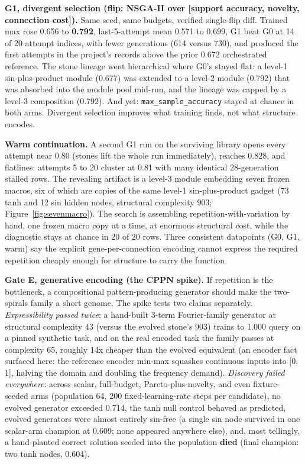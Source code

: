 \documentclass[11pt]{article}
\begin{document}
\textbf{G1, divergent selection (flip: NSGA-II over [support accuracy, novelty, connection cost]).} Same seed, same budgets, verified single-flip diff. Trained max rose 0.656 to \textbf{0.792}, last-5-attempt mean 0.571 to 0.699, G1 beat G0 at 14 of 20 attempt indices, with fewer generations (614 versus 730), and produced the first attempts in the project's records above the prior 0.672 orchestrated reference. The stone lineage went hierarchical where G0's stayed flat: a level-1 sin-plus-product module (0.677) was extended to a level-2 module (0.792) that was absorbed into the module pool mid-run, and the lineage was capped by a level-3 composition (0.792). And yet: \texttt{max_sample_accuracy} stayed at chance in both arms. Divergent selection improves what training finds, not what structure encodes.

\textbf{Warm continuation.} A second G1 run on the surviving library opens every attempt near 0.80 (stones lift the whole run immediately), reaches 0.828, and flatlines: attempts 5 to 20 cluster at 0.81 with many identical 28-generation stalled rows. The revealing artifact is a level-3 module embedding seven frozen macros, six of which are copies of the same level-1 sin-plus-product gadget (73 tanh and 12 sin hidden nodes, structural complexity 903; Figure~\ref{fig:sevenmacro}). The search is assembling repetition-with-variation by hand, one frozen macro copy at a time, at enormous structural cost, while the diagnostic stays at chance in 20 of 20 rows. Three consistent datapoints (G0, G1, warm) say the explicit gene-per-connection encoding cannot express the required repetition cheaply enough for structure to carry the function.

\textbf{Gate E, generative encoding (the CPPN spike).} If repetition is the bottleneck, a compositional pattern-producing generator \citep{stanley2007} should make the two-spirals family a short genome. The spike tests two claims separately. \emph{Expressibility passed twice}: a hand-built 3-term Fourier-family generator at structural complexity 43 (versus the evolved stone's 903) trains to 1.000 query on a pinned synthetic task, and on the real encoded task the family passes at complexity 65, roughly 14x cheaper than the evolved equivalent (an encoder fact surfaced here: the reference encoder min-max squashes continuous inputs into [0, 1], halving the domain and doubling the frequency demand). \emph{Discovery failed everywhere}: across scalar, full-budget, Pareto-plus-novelty, and even fixture-seeded arms (population 64, 200 fixed-learning-rate steps per candidate), no evolved generator exceeded 0.714, the tanh null control behaved as predicted, evolved generators were almost entirely sin-free (a single sin node survived in one scalar-arm champion at 0.609; none appeared anywhere else), and, most tellingly, a hand-planted correct solution seeded into the population \textbf{died} (final champion: two tanh nodes, 0.604).
\end{document}
